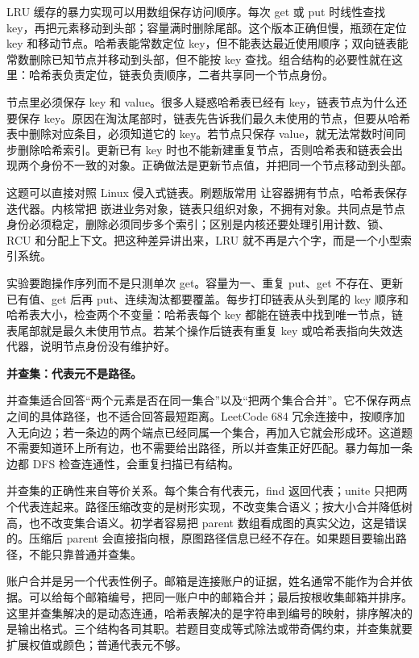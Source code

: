 LRU 缓存的暴力实现可以用数组保存访问顺序。每次 get 或 put 时线性查找 key，再把元素移动到头部；容量满时删除尾部。这个版本正确但慢，瓶颈在定位 key 和移动节点。哈希表能常数定位 key，但不能表达最近使用顺序；双向链表能常数删除已知节点并移动到头部，但不能按 key 查找。组合结构的必要性就在这里：哈希表负责定位，链表负责顺序，二者共享同一个节点身份。

节点里必须保存 key 和 value。很多人疑惑哈希表已经有 key，链表节点为什么还要保存 key。原因在淘汰尾部时，链表先告诉我们最久未使用的节点，但要从哈希表中删除对应条目，必须知道它的 key。若节点只保存 value，就无法常数时间同步删除哈希索引。更新已有 key 时也不能新建重复节点，否则哈希表和链表会出现两个身份不一致的对象。正确做法是更新节点值，并把同一个节点移动到头部。

这题可以直接对照 Linux 侵入式链表。刷题版常用  让容器拥有节点，哈希表保存迭代器。内核常把  嵌进业务对象，链表只组织对象，不拥有对象。共同点是节点身份必须稳定，删除必须同步多个索引；区别是内核还要处理引用计数、锁、RCU 和分配上下文。把这种差异讲出来，LRU 就不再是六个字，而是一个小型索引系统。

实验要跑操作序列而不是只测单次 get。容量为一、重复 put、get 不存在、更新已有值、get 后再 put、连续淘汰都要覆盖。每步打印链表从头到尾的 key 顺序和哈希表大小，检查两个不变量：哈希表每个 key 都能在链表中找到唯一节点，链表尾部就是最久未使用节点。若某个操作后链表有重复 key 或哈希表指向失效迭代器，说明节点身份没有维护好。

\noindent\textbf{并查集：代表元不是路径。}

并查集适合回答“两个元素是否在同一集合”以及“把两个集合合并”。它不保存两点之间的具体路径，也不适合回答最短距离。LeetCode 684 冗余连接中，按顺序加入无向边；若一条边的两个端点已经同属一个集合，再加入它就会形成环。这道题不需要知道环上所有边，也不需要给出路径，所以并查集正好匹配。暴力每加一条边都 DFS 检查连通性，会重复扫描已有结构。

并查集的正确性来自等价关系。每个集合有代表元，find 返回代表；unite 只把两个代表连起来。路径压缩改变的是树形实现，不改变集合语义；按大小合并降低树高，也不改变集合语义。初学者容易把 parent 数组看成图的真实父边，这是错误的。压缩后 parent 会直接指向根，原图路径信息已经不存在。如果题目要输出路径，不能只靠普通并查集。

账户合并是另一个代表性例子。邮箱是连接账户的证据，姓名通常不能作为合并依据。可以给每个邮箱编号，把同一账户中的邮箱合并；最后按根收集邮箱并排序。这里并查集解决的是动态连通，哈希表解决的是字符串到编号的映射，排序解决的是输出格式。三个结构各司其职。若题目变成等式除法或带奇偶约束，并查集就要扩展权值或颜色；普通代表元不够。

